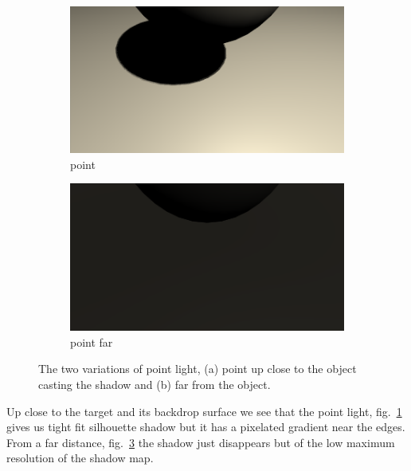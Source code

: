 \begin{figure}
\begin{subfigure}[t]{0.5\textwidth}
\centering
\includegraphics[width=\linewidth]{figures/shadows/point-cleaned}
\caption{point}
\label{fig:point}
\end{subfigure}%
    \hfill
\begin{subfigure}[t]{0.5\textwidth}
\centering
\includegraphics[width=\linewidth]{figures/shadows/point-far-cleaned}
\caption{point far}
\label{fig:point-far}
\end{subfigure}
\caption{The two variations of point light, (a) point up close to the object casting the shadow and (b) far from the object.}
\end{figure}

Up close to the target and its backdrop surface we see that the point light, fig.~\ref{fig:point} gives us tight fit silhouette shadow but it has a pixelated gradient near the edges. From a far distance, fig.~\ref{fig:point-far} the shadow just disappears but of the low maximum resolution of the shadow map.

